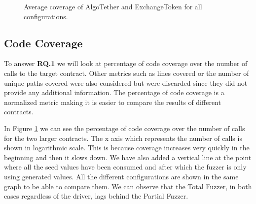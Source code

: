 \begin{figure}[!hbp]
    \centering
    \hfill
    \caption{Average coverage of AlgoTether and ExchangeToken for all configurations.}
    \label{fig:percent_coverage}
\end{figure}

\subsection*{Code Coverage}
To answer \textbf{RQ.1} we will look at percentage of code coverage over the number of calls to the target contract.
Other metrics such as lines covered or the number of unique paths covered were also considered but were discarded since they did not provide any additional information.
The percentage of code coverage is a normalized metric making it is easier to compare the results of different contracts.

In Figure \ref{fig:percent_coverage} we can see the percentage of code coverage over the number of calls for the two larger contracts.
The x axis which represents the number of calls is shown in logarithmic scale.
This is because coverage increases very quickly in the beginning and then it slows down.
We have also added a vertical line at the point where all the seed values have been consumed and after which the fuzzer is only using generated values.
All the different configurations are shown in the same graph to be able to compare them.
We can observe that the Total Fuzzer, in both cases regardless of the driver, lags behind the Partial Fuzzer.

